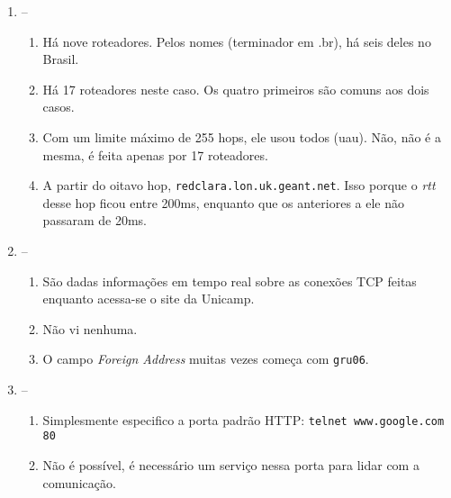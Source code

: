 \documentclass[11pt]{article}
\newcommand{\tit}[1]{\textit{#1}}
\newcommand{\ttt}[1]{\texttt{#1}}
\begin{document}
\begin{enumerate}
\item --
\begin{enumerate}
	\item Há nove roteadores. Pelos nomes (terminador em .br), há seis deles
		no Brasil.
	\item Há 17 roteadores neste caso. Os quatro primeiros são comuns aos dois
		casos.
	\item Com um limite máximo de 255 hops, ele usou todos (uau). 
		Não, não é a mesma, é feita apenas por 17 roteadores.
	\item A partir do oitavo hop, \ttt{redclara.lon.uk.geant.net}. Isso porque
		o \tit{rtt} desse hop ficou entre 200ms, enquanto que os anteriores
		a ele não passaram de 20ms.
\end{enumerate}

\item --
\begin{enumerate}
	\item São dadas informações em tempo real sobre as conexões TCP feitas
		enquanto acessa-se o site da Unicamp.
	\item Não vi nenhuma.
	\item O campo \tit{Foreign Address} muitas vezes começa com 
		\ttt{gru06}.
\end{enumerate}

\item --
\begin{enumerate}
	\item Simplesmente especifico a porta padrão HTTP:
		\ttt{telnet www.google.com 80}
	\item Não é possível, é necessário um serviço nessa porta para lidar com a 
		comunicação.
\end{enumerate}

\end{enumerate}
\end{document}
